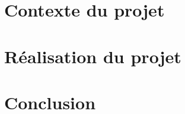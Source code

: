 \documentclass{article}
\begin{document}
\newpage

\section{Contexte du projet}

\section{Réalisation du projet}

\section{Conclusion}

\newpage
\appendix

\newpage

\makepfequatriemeinsa{}
\end{document}
